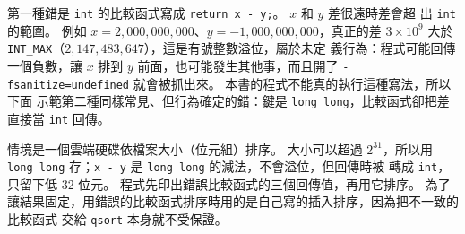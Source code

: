 第一種錯是 \texttt{int} 的比較函式寫成 \texttt{return x - y;}。 $x$ 和 $y$ 差很遠時差會超
出 \texttt{int} 的範圍。 例如 $x = 2{,}000{,}000{,}000$、$y = -1{,}000{,}000{,}000$，真正的差
$3 \times 10^9$ 大於 \texttt{INT\_MAX}（$2{,}147{,}483{,}647$），這是有號整數溢位，屬於未定
義行為：程式可能回傳一個負數，讓 $x$ 排到 $y$ 前面，也可能發生其他事，而且開了
\texttt{-fsanitize=undefined} 就會被抓出來。 本書的程式不能真的執行這種寫法，所以下面
示範第二種同樣常見、但行為確定的錯：鍵是 \texttt{long long}，比較函式卻把差直接當
\texttt{int} 回傳。

情境是一個雲端硬碟依檔案大小（位元組）排序。 大小可以超過 $2^{31}$，所以用
\texttt{long long} 存；\texttt{x - y} 是 \texttt{long long} 的減法，不會溢位，但回傳時被
轉成 \texttt{int}，只留下低 32 位元。 程式先印出錯誤比較函式的三個回傳值，再用它排序。
為了讓結果固定，用錯誤的比較函式排序時用的是自己寫的插入排序，因為把不一致的比較函式
交給 \texttt{qsort} 本身就不受保證。

